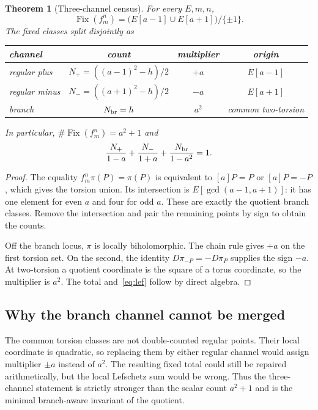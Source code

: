 \documentclass[10pt]{article}
\newtheorem{theorem}{Theorem}
\newcommand{\Fix}{\operatorname{Fix}}
\begin{document}
\begin{theorem}[Three-channel census]\label{thm:channels}
For every $E,m,n$,
\[
 \Fix(f_m^n)=\big(E[a-1]\cup E[a+1]\big)/\{\pm1\}.
\]
The fixed classes split disjointly as
\begin{center}
\begin{tabular}{@{}lccc@{}}
\toprule
channel & count & multiplier & origin\\
\midrule
regular plus & $N_+=((a-1)^2-h)/2$ & $+a$ & $E[a-1]$\\
regular minus & $N_-=((a+1)^2-h)/2$ & $-a$ & $E[a+1]$\\
branch & $N_{\rm br}=h$ & $a^2$ & common two-torsion\\
\bottomrule
\end{tabular}
\end{center}
In particular, $\#\Fix(f_m^n)=a^2+1$ and
\begin{equation}\label{eq:lef}
 \frac{N_+}{1-a}+\frac{N_-}{1+a}+\frac{N_{\rm br}}{1-a^2}=1.
\end{equation}
\end{theorem}

\begin{proof}
The equality $f_m^n\pi(P)=\pi(P)$ is equivalent to $[a]P=P$ or $[a]P=-P$,
which gives the torsion union.  Its intersection is
$E[\gcd(a-1,a+1)]$: it has one element for even $a$ and four for odd $a$.
These are exactly the quotient branch classes.  Remove the intersection and
pair the remaining points by sign to obtain the counts.

Off the branch locus, $\pi$ is locally biholomorphic.  The chain rule gives
$+a$ on the first torsion set.  On the second, the identity
$D\pi_{-P}=-D\pi_P$ supplies the sign $-a$.  At two-torsion a quotient
coordinate is the square of a torus coordinate, so the multiplier is $a^2$.
The total and~\eqref{eq:lef} follow by direct algebra.
\end{proof}

\subsection*{Why the branch channel cannot be merged}
The common torsion classes are not double-counted regular points.  Their local
coordinate is quadratic, so replacing them by either regular channel would
assign multiplier $\pm a$ instead of $a^2$.  The resulting fixed total could
still be repaired arithmetically, but the local Lefschetz sum would be wrong.
Thus the three-channel statement is strictly stronger than the scalar count
$a^2+1$ and is the minimal branch-aware invariant of the quotient.
\end{document}

